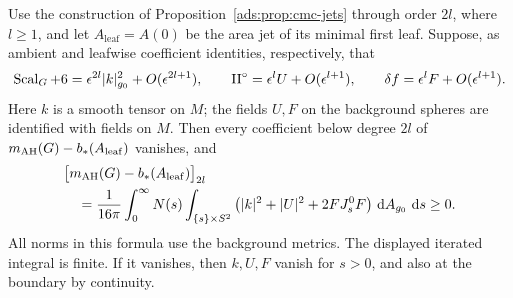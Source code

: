 \begin{proposition}
\label{ads:prop:leading-energy}
Use the construction of Proposition~\ref{ads:prop:cmc-jets} through order
\(2l\), where \(l\ge1\), and let \(A_{\mathrm{leaf}}=A(0)\) be the area
jet of its minimal first leaf.
Suppose, as ambient and leafwise coefficient identities, respectively,
that
\begin{equation}\label{ads:cmc:leading-assumptions}
 \operatorname{Scal}_G+6=\epsilon^{2l}|k|_{g_0}^2+O(\epsilon^{2l+1}),
 \qquad
 \mathrm{II}^\circ=\epsilon^lU+O(\epsilon^{l+1}),
 \qquad
 \delta f=\epsilon^lF+O(\epsilon^{l+1}).
\end{equation}
Here \(k\) is a smooth tensor on \(M\); the fields \(U,F\) on the
background spheres are identified with fields on \(M\).
Then every coefficient below degree \(2l\) of
\(m_{\mathrm{AH}}(G)-b_*(A_{\mathrm{leaf}})\) vanishes, and
\begin{equation}\label{ads:cmc:leading-integral}
 \begin{split}
 &\bigl[m_{\mathrm{AH}}(G)-b_*(A_{\mathrm{leaf}})\bigr]_{2l}\\
 &\quad=\frac1{16\pi}\int_0^\infty N(s)
   \int_{\{s\}\times S^2}
    \left(|k|^2+|U|^2+2FJ_s^0F\right)\,\mathrm d A_{g_0}\,\,\mathrm d s
 \ge0.
 \end{split}
\end{equation}
All norms in this formula use the background metrics.
The displayed iterated integral is finite.
If it vanishes, then \(k,U,F\) vanish for \(s>0\), and also at the
boundary by continuity.
\end{proposition}

